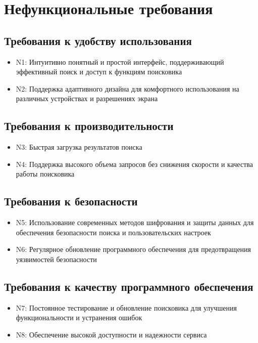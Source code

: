 \documentclass[12pt,a4paper]{article}
\begin{document}
\section{Нефункциональные требования}
\subsection{Требования к удобству использования}
\begin{itemize}
    \item N1: Интуитивно понятный и простой интерфейс, поддерживающий эффективный поиск и доступ к функциям поисковика
    \item N2: Поддержка адаптивного дизайна для комфортного использования на различных устройствах и разрешениях экрана
\end{itemize}
\subsection{Требования к производительности}
\begin{itemize}
    \item N3: Быстрая загрузка результатов поиска
    \item N4: Поддержка высокого объема запросов без снижения скорости и качества работы поисковика
\end{itemize}
\subsection{Требования к безопасности}
\begin{itemize}
    \item N5: Использование современных методов шифрования и защиты данных для обеспечения безопасности поиска и пользовательских настроек
    \item N6: Регулярное обновление программного обеспечения для предотвращения уязвимостей безопасности
\end{itemize}
\subsection{Требования к качеству программного обеспечения}
\begin{itemize}
    \item N7: Постоянное тестирование и обновление поисковика для улучшения функциональности и устранения ошибок
    \item N8: Обеспечение высокой доступности и надежности сервиса
\end{itemize}
\end{document}
